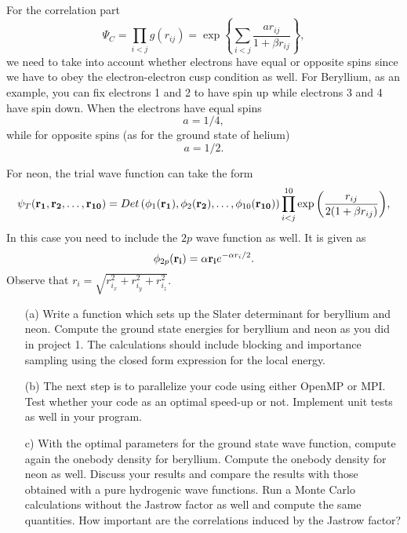 \documentclass[10pt]{article}
\begin{document}
For the correlation part 
\[
\Psi_C=\prod_{i< j}g(r_{ij})= \exp{\left\{\sum_{i<j}\frac{ar_{ij}}{1+\beta r_{ij}}\right\}},
\]
we need to take into account whether electrons have equal or opposite spins since we have to obey the
electron-electron cusp condition as well.  For Beryllium, as an example,  you can fix electrons 1 and 2 to have spin up while
electrons 3 and 4 have spin down.
When the electrons have  equal spins 
\[
a= 1/4,
\]
while for opposite spins (as for the ground state of  helium)
\[
a= 1/2.
\] 

For neon, the trial wave function can take the form
\begin{equation}
   \psi_{T}({\bf r_1},{\bf r_2}, \dots,{\bf r_{10}}) = 
   Det\left(\phi_{1}({\bf r_1}),\phi_{2}({\bf r_2}),
   \dots,\phi_{10}({\bf r_{10}})\right)
   \prod_{i<j}^{10}\exp{\left(\frac{r_{ij}}{2(1+\beta r_{ij})}\right)}, 
\end{equation}
In this case you need to include the $2p$ wave function as well.
It is given as
\begin{equation} 
\phi_{2p}({\bf r_i}) = \alpha {\bf r_i}e^{-\alpha r_i/2}.
\end{equation}
Observe that $r_i = \sqrt{r_{i_x}^2+r_{i_y}^2+r_{i_z}^2}$.

\begin{enumerate}
\item[(a)]   Write a function which sets up the Slater determinant for beryllium and neon.
Compute the ground state energies for beryllium and neon as you did in project 1. 
The calculations should include  blocking and importance sampling using the closed form expression for the local energy.

\item[(b)] The next step is to parallelize your code using either OpenMP or MPI. 
Test whether your code as an optimal speed-up or not. 
Implement unit tests as well in your program. 

\item[c)]  With the optimal parameters for the ground state wave function, compute again the onebody density for beryllium. Compute the onebody density for neon as well. Discuss your results and compare the results with those obtained with a pure hydrogenic wave functions. Run a Monte Carlo calculations without the Jastrow factor as well
and compute the same quantities. How important are the correlations induced by the Jastrow factor?




\end{enumerate}
\end{document}
